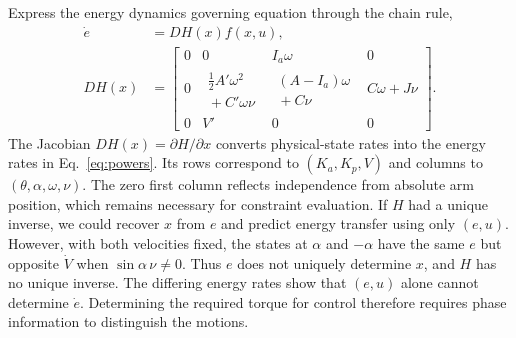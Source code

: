 \documentclass[letterpaper,10pt,conference]{ieeeconf}
\begin{document}
Express the energy dynamics governing equation through the chain rule,
\begingroup
\setlength{\arraycolsep}{4pt}
\begin{equation}
\begin{aligned}
 \dot e&=DH(x)f(x,u),\\
 DH(x)&=
 \begin{bmatrix}
 0&0&I_a\omega&0\\[3pt]
 0&\begin{gathered}\tfrac12A'\omega^2\\{}+C'\omega\nu\end{gathered}
 &\begin{gathered}(A-I_a)\omega\\{}+C\nu\end{gathered}&C\omega+J\nu\\[3pt]
 0&V'&0&0
 \end{bmatrix}.
\end{aligned}
\label{eq:energy-jacobian}
\end{equation}
\endgroup
The Jacobian $DH(x)=\partial H/\partial x$ converts physical-state rates into the energy rates in Eq.~\eqref{eq:powers}. Its rows correspond to $(K_a,K_p,V)$ and columns to $(\theta,\alpha,\omega,\nu)$. The zero first column reflects independence from absolute arm position, which remains necessary for constraint evaluation. If $H$ had a unique inverse, we could recover $x$ from $e$ and predict energy transfer using only $(e,u)$. However, with both velocities fixed, the states at $\alpha$ and $-\alpha$ have the same $e$ but opposite $\dot V$ when $\sin\alpha\,\nu\ne0$. Thus $e$ does not uniquely determine $x$, and $H$ has no unique inverse. The differing energy rates show that $(e,u)$ alone cannot determine $\dot e$. Determining the required torque for control therefore requires phase information to distinguish the motions. 
\end{document}
